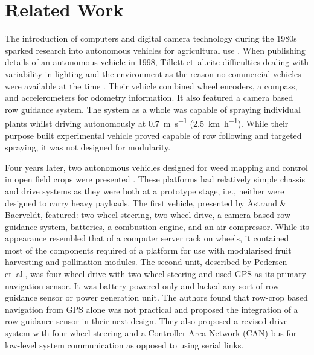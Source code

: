 \documentclass[preprint,authoryear,12pt]{elsarticle}
\begin{document}
\section{Related Work}
\label{sect:review}

        The introduction of computers and digital camera technology during the 1980s sparked research into autonomous vehicles for agricultural use \citep{Li2009}.
        When publishing details of an autonomous vehicle in 1998, Tillett et~al.\@ cite difficulties dealing with variability in lighting and the environment as the reason no commercial vehicles were available at the time \citep{Tillett1998}.
        Their vehicle combined wheel encoders, a compass, and accelerometers for odometry information.
        It also featured a camera based row guidance system.
        The system as a whole was capable of spraying individual plants whilst driving autonomously at \SI{0.7}{\meter\per\second} (\SI{2.5}{\kilo\meter\per\hour}).
        While their purpose built experimental vehicle proved capable of row following and targeted spraying, it was not designed for modularity.


        Four years later, two autonomous vehicles designed for weed mapping and control in open field crops were presented \citep{Pedersen2002,Astrand2002}.
        These platforms had relatively simple chassis and drive systems as they were both at a prototype stage, i.e., neither were designed to carry heavy payloads.
        The first vehicle, presented by Åstrand \& Baerveldt, featured: two-wheel steering, two-wheel drive, a camera based row guidance system, batteries, a combustion engine, and an air compressor.
        While its appearance resembled that of a computer server rack on wheels, it contained most of the components required of a platform for use with modularised fruit harvesting and pollination modules.
        The second unit, described by Pedersen et~al.\@, was four-wheel drive with two-wheel steering and used GPS as its primary navigation sensor.
        It was battery powered only and lacked any sort of row guidance sensor or power generation unit.
        The authors found that row-crop based navigation from GPS alone was not practical and proposed the integration of a row guidance sensor in their next design.
        They also proposed a revised drive system with four wheel steering and a Controller Area Network (CAN) bus for low-level system communication as opposed to using serial links.
\end{document}
